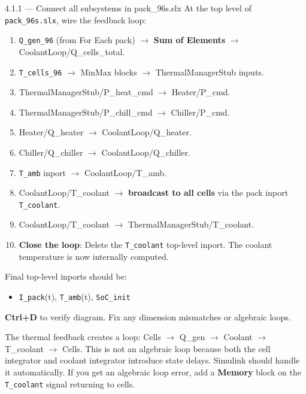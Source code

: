 \documentclass[11pt,a4paper]{article}
\begin{document}
\begin{guistep}{4.1.1 — Connect all subsystems in pack\_96s.slx}
At the top level of \texttt{pack\_96s.slx}, wire the feedback loop:
\begin{enumerate}
    \item \texttt{Q\_gen\_96} (from For Each pack) $\to$ \textbf{Sum of Elements} $\to$ CoolantLoop/Q\_cells\_total.
    \item \texttt{T\_cells\_96} $\to$ MinMax blocks $\to$ ThermalManagerStub inputs.
    \item ThermalManagerStub/P\_heat\_cmd $\to$ Heater/P\_cmd.
    \item ThermalManagerStub/P\_chill\_cmd $\to$ Chiller/P\_cmd.
    \item Heater/Q\_heater $\to$ CoolantLoop/Q\_heater.
    \item Chiller/Q\_chiller $\to$ CoolantLoop/Q\_chiller.
    \item \texttt{T\_amb} inport $\to$ CoolantLoop/T\_amb.
    \item CoolantLoop/T\_coolant $\to$ \textbf{broadcast to all cells} via the pack inport \texttt{T\_coolant}.
    \item CoolantLoop/T\_coolant $\to$ ThermalManagerStub/T\_coolant.
    \item \textbf{Close the loop}: Delete the \texttt{T\_coolant} top-level inport. The coolant temperature is now internally computed.
\end{enumerate}

Final top-level inports should be:
\begin{itemize}
    \item \texttt{I\_pack}(t), \texttt{T\_amb}(t), \texttt{SoC\_init}
\end{itemize}

\textbf{Ctrl+D} to verify diagram. Fix any dimension mismatches or algebraic loops.
\end{guistep}

\begin{warnbox}
The thermal feedback creates a loop: Cells $\to$ Q\_gen $\to$ Coolant $\to$ T\_coolant $\to$ Cells. This is not an algebraic loop because both the cell integrator and coolant integrator introduce state delays. Simulink should handle it automatically. If you get an algebraic loop error, add a \textbf{Memory} block on the \texttt{T\_coolant} signal returning to cells.
\end{warnbox}

\end{document}
